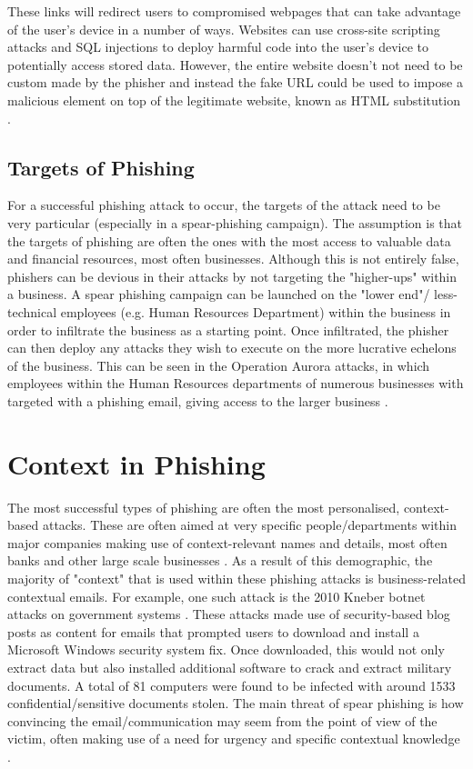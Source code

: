 \documentclass{l4proj}
\begin{document}
These links will redirect users to compromised webpages that can take advantage of the user’s device in a number of ways. Websites can use cross-site scripting attacks and SQL injections to deploy harmful code into the user’s device to potentially access stored data. However, the entire website doesn’t not need to be custom made by the phisher and instead the fake URL could be used to impose a malicious element on top of the legitimate website, known as HTML substitution \citep{chiew2018survey}.

\subsection{Targets of Phishing}
For a successful phishing attack to occur, the targets of the attack need to be very particular (especially in a spear-phishing campaign). The assumption is that the targets of phishing are often the ones with the most access to valuable data and financial resources, most often businesses. Although this is not entirely false, phishers can be devious in their attacks by not targeting the "higher-ups" within a business. A spear phishing campaign can be launched on the "lower end"/ less-technical employees (e.g. Human Resources Department) within the business in order to infiltrate the business as a starting point. Once infiltrated, the phisher can then deploy any attacks they wish to execute on the more lucrative echelons of the business. This can be seen in the Operation Aurora attacks, in which employees within the Human Resources departments of numerous businesses with targeted with a phishing email, giving access to the larger business  \citep{bodmer2012reverse}.

\section{Context in Phishing}
The most successful types of phishing are often the most personalised, context-based attacks. These are often aimed at very specific people/departments within major companies making use of context-relevant names and details, most often banks and other large scale businesses \citep{tally2004anti}. As a result of this demographic, the majority of "context" that is used within these phishing attacks is business-related contextual emails. For example, one such attack is the 2010 Kneber botnet attacks on government systems \citep{villeneuve2010kneber}. These attacks made use of security-based blog posts as content for emails that prompted users to download and install a Microsoft Windows security system fix. Once downloaded, this would not only extract data but also installed additional software to crack and extract military documents. A total of 81 computers were found to be infected with around 1533 confidential/sensitive documents stolen. The main threat of spear phishing is how convincing the email/communication may seem from the point of view of the victim, often making use of a need for urgency and specific contextual knowledge \citep{nicho2018evaluating}.
\end{document}

